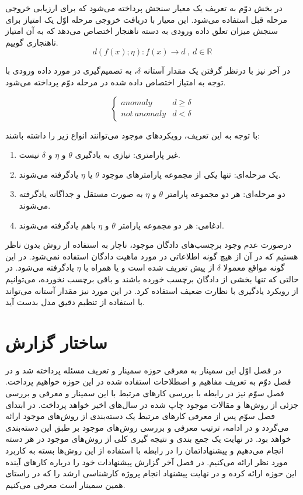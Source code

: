 \documentclass[12pt,a4paper]{report}
\theoremstyle{definition}
\theoremstyle{definition}
\begin{document}
در بخش دوّم به تعریف یک معیار سنجش پرداخته می‌شود که برای ارزیابی خروجی مرحله قبل استفاده می‌شود. این معیار با دریافت خروجی مرحله اوّل یک امتیاز برای سنجش میزان تعلق داده ورودی به دسته ناهنجار اختصاص می‌دهد که به آن امتیاز ناهنجاری گوییم.
\begin{equation}
d(f(x);\eta): f(x) \rightarrow d \  ,\  d \in \mathbb{R}
\end{equation}

در آخر نیز با درنظر گرفتن یک مقدار آستانه $\delta$، به تصمیم‌گیری در مورد داده ورودی با توجه به امتیاز اختصاص داده شده در مرحله دوّم پرداخته می‌شود.

$$
\left\{
	\begin{array}{ll}
		anomaly  & d \geq \delta \\
		not\ anomaly & d < \delta
	\end{array}
\right.
$$

با توجه به این تعریف، رویکرد‌های موجود می‌توانند انواع زیر را داشته باشند:
\begin{enumerate}
	\item {غیر پارامتری: نیازی به یادگیری $\theta$ و $\eta$ و $\delta$ نیست.}
	\item{یک مرحله‌ای: تنها یکی از مجموعه پارامترهای موجود $\theta$ یا  $\eta$ یاد‌گرفته می‌شوند.}
	\item{دو مرحله‌ای:‌ هر دو مجموعه پارامتر $\theta$ و $\eta$ به صورت مستقل و جداگانه یاد‌گرفته می‌شوند.}
	\item{ادغامی: هر دو مجموعه پارامتر $\theta$ و $\eta$ باهم یادگرفته می‌شوند. }
\end{enumerate}

درصورت عدم وجود برچسب‌های دادگان موجود، ناچار به استفاده از روش بدون ناظر هستیم که در آن از هیچ گونه اطلاعاتی در مورد ماهیت دادگان استفاده نمی‌شود. در  این گونه مواقع معمولا $\delta$ از پیش تعریف شده است و یا همراه با  $\eta$ یادگرفته می‌شود. در حالتی که تنها بخشی از دادگان برچسب خورده باشند و باقی برچسب نخورده، می‌توانیم از رویکرد یادگیری با نظارت ضعیف استفاده کرد. در این مورد نیز مقدار آستانه می‌تواند با استفاده از تنظیم دقیق مدل بدست آید.
	
	\section{ساختار گزارش}
در فصل اوّل این سمینار به معرفی حوزه سمینار و تعریف مسئله پرداخته شد و در فصل دوّم به تعریف مفاهیم و اصطلاحات استفاده شده در این حوزه خواهیم پرداخت. فصل سوّم نیز در رابطه با بررسی کار‌های مرتبط با این سمینار و معرفی و بررسی جزئی از روش‌ها و مقالات موجود چاپ شده در سال‌های اخیر خواهد پرداخت. در ابتدای فصل سوّم پس از معرفی کار‌های مرتبط یک دسته‌بندی از روش‌های موجود ارائه می‌گردد و در ادامه، ترتیب معرفی و بررسی روش‌های موجود بر طبق این دسته‌بندی خواهد بود. در نهایت یک جمع بندی و نتیجه گیری کلی از روش‌های موجود در هر دسته انجام می‌دهیم و پیشنهاداتمان را در رابطه با استفاده از این روش‌ها بسته به کاربرد مورد نظر ارائه می‌کنیم. در فصل آخر گزارش پیشنهادات خود را درباره کار‌های آینده این حوزه ارائه کرده و در نهایت پیشنهاد انجام پروژه کارشناسی ارشد را که در راستای همین سمینار است معرفی می‌کنیم.
\end{document}
